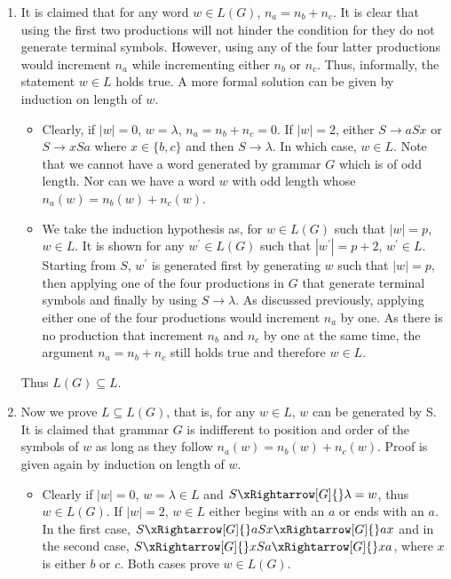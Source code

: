 \begin{enumerate}

	\item
	It is claimed that for any word $w \in L(G)$, $n_a = n_b + n_c$.
	It is clear that using the first two productions will not hinder the condition for they do not generate terminal symbols.
	However, using any of the four latter productions would increment $n_a$ while incrementing either $n_b$ or $n_c$.
	Thus, informally, the statement $w \in L$ holds true.
	A more formal solution can be given by induction on length of $w$.

	\begin{itemize}[label={}]

		\item
		Clearly, if $|w| = 0$, $w = \lambda$, $n_a = n_b + n_c = 0$.
		If $|w| = 2$, either $S\rightarrow aSx$ or $S\rightarrow xSa$ where $x \in \{b,c\}$ and then $S\rightarrow \lambda$.
		In which case, $w \in L$.
		Note that we cannot have a word generated by grammar $G$ which is of odd length.
		Nor can we have a word $w$ with odd length whose $n_a(w) = n_b(w) + n_c(w)$.

		\item
		We take the induction hypothesis as, for $w \in L(G)$ such that $|w| = p$, $w \in L$.
		It is shown for any $w^\prime \in L(G)$ such that $|w^\prime| = p + 2$, $w^\prime \in L$.
		Starting from $S$, $w^\prime$ is generated first by generating $w$ such that $|w| = p$, then applying one of the four productions in $G$ that generate terminal symbols and finally by using $S\rightarrow \lambda$.
		As discussed previously, applying either one of the four productions would increment $n_a$ by one.
		As there is no production that increment $n_b$ and $n_c$ by one at the same time, the argument $n_a = n_b + n_c$ still holds true and therefore $w \in L$.

	\end{itemize}

	Thus $L(G) \subseteq L$.

	\item
	Now we prove $L \subseteq L(G)$, that is, for any $w \in L$, $w$ can be generated by S.
	It is claimed that grammar $G$ is indifferent to position and order of the symbols of $w$ as long as they follow $n_a(w) = n_b(w) + n_c(w)$.
	Proof is given again by induction on length of $w$.

	\begin{itemize}[label={}]

		\item
		Clearly if $|w| = 0$, $w = \lambda \in L$ and $S\xRightarrow[G]{} \lambda = w$, thus $w \in L(G)$.
		If $|w| = 2$, $w \in L$ either begins with an $a$ or ends with an $a$.
		In the first case, $S\xRightarrow[G]{} aSx \xRightarrow[G]{} ax$ and in the second case, $S\xRightarrow[G]{} xSa \xRightarrow[G]{} xa$, where $x$ is either $b$ or $c$.
		Both cases prove $w \in L(G)$.


\end{itemize}
\end{enumerate}
